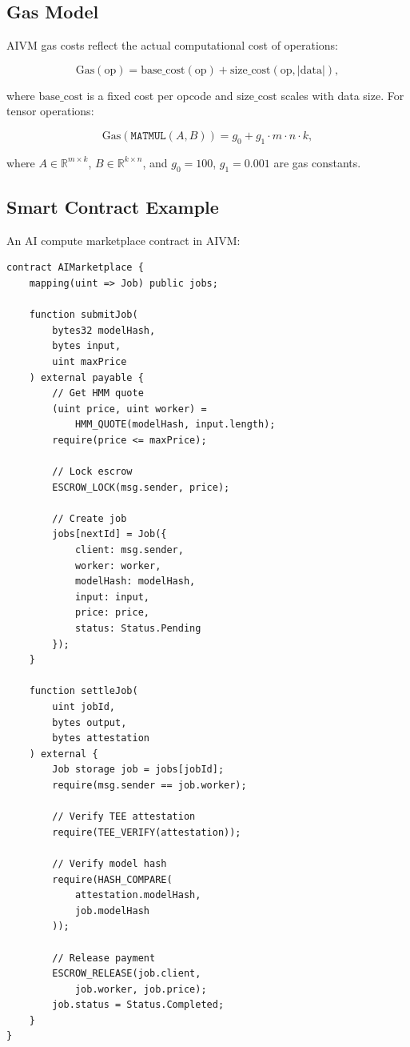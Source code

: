 \subsection{Gas Model}

AIVM gas costs reflect the actual computational cost of operations:

\begin{equation}
\text{Gas}(\text{op}) = \text{base\_cost}(\text{op}) + \text{size\_cost}(\text{op}, |\text{data}|),
\end{equation}

where $\text{base\_cost}$ is a fixed cost per opcode and $\text{size\_cost}$ scales with data size. For tensor operations:

\begin{equation}
\text{Gas}(\texttt{MATMUL}(A, B)) = g_0 + g_1 \cdot m \cdot n \cdot k,
\end{equation}

where $A \in \mathbb{R}^{m \times k}$, $B \in \mathbb{R}^{k \times n}$, and $g_0 = 100$, $g_1 = 0.001$ are gas constants.

\subsection{Smart Contract Example}

An AI compute marketplace contract in AIVM:

\begin{lstlisting}[caption={AIVM marketplace contract (pseudocode).}]
contract AIMarketplace {
    mapping(uint => Job) public jobs;

    function submitJob(
        bytes32 modelHash,
        bytes input,
        uint maxPrice
    ) external payable {
        // Get HMM quote
        (uint price, uint worker) =
            HMM_QUOTE(modelHash, input.length);
        require(price <= maxPrice);

        // Lock escrow
        ESCROW_LOCK(msg.sender, price);

        // Create job
        jobs[nextId] = Job({
            client: msg.sender,
            worker: worker,
            modelHash: modelHash,
            input: input,
            price: price,
            status: Status.Pending
        });
    }

    function settleJob(
        uint jobId,
        bytes output,
        bytes attestation
    ) external {
        Job storage job = jobs[jobId];
        require(msg.sender == job.worker);

        // Verify TEE attestation
        require(TEE_VERIFY(attestation));

        // Verify model hash
        require(HASH_COMPARE(
            attestation.modelHash,
            job.modelHash
        ));

        // Release payment
        ESCROW_RELEASE(job.client,
            job.worker, job.price);
        job.status = Status.Completed;
    }
}
\end{lstlisting}

